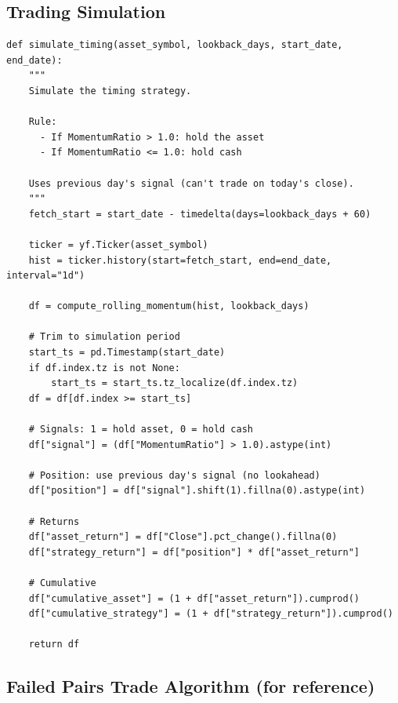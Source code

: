 \documentclass[11pt,a4paper]{article}
\begin{document}
\subsection{Trading Simulation}

\begin{codebox}
\begin{lstlisting}[style=python]
def simulate_timing(asset_symbol, lookback_days, start_date, end_date):
    """
    Simulate the timing strategy.

    Rule:
      - If MomentumRatio > 1.0: hold the asset
      - If MomentumRatio <= 1.0: hold cash

    Uses previous day's signal (can't trade on today's close).
    """
    fetch_start = start_date - timedelta(days=lookback_days + 60)

    ticker = yf.Ticker(asset_symbol)
    hist = ticker.history(start=fetch_start, end=end_date, interval="1d")

    df = compute_rolling_momentum(hist, lookback_days)

    # Trim to simulation period
    start_ts = pd.Timestamp(start_date)
    if df.index.tz is not None:
        start_ts = start_ts.tz_localize(df.index.tz)
    df = df[df.index >= start_ts]

    # Signals: 1 = hold asset, 0 = hold cash
    df["signal"] = (df["MomentumRatio"] > 1.0).astype(int)

    # Position: use previous day's signal (no lookahead)
    df["position"] = df["signal"].shift(1).fillna(0).astype(int)

    # Returns
    df["asset_return"] = df["Close"].pct_change().fillna(0)
    df["strategy_return"] = df["position"] * df["asset_return"]

    # Cumulative
    df["cumulative_asset"] = (1 + df["asset_return"]).cumprod()
    df["cumulative_strategy"] = (1 + df["strategy_return"]).cumprod()

    return df
\end{lstlisting}
\end{codebox}

\subsection{Failed Pairs Trade Algorithm (for reference)}
\end{document}
